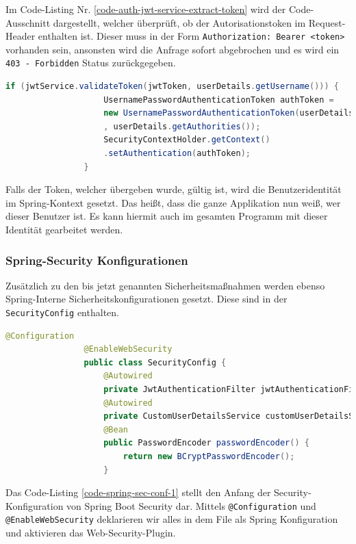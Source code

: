 			
			Im Code-Listing Nr. \ref{code-auth-jwt-service-extract-token} wird der Code-Ausschnitt dargestellt, welcher überprüft, ob der Autorisationstoken im Request-Header enthalten ist. Dieser muss in der Form \texttt{Authorization: Bearer <token>} vorhanden sein, ansonsten wird die Anfrage sofort abgebrochen und es wird ein \texttt{403 - Forbidden} Status zurückgegeben.
			
			\begin{lstlisting}[caption={Validierung des JWT-Tokens und Setzen der Authentifizierung im Spring-Kontext.}, label={code-auth-jwtservice-validate-token}, language=Java]
				if (jwtService.validateToken(jwtToken, userDetails.getUsername())) {
					UsernamePasswordAuthenticationToken authToken =
					new UsernamePasswordAuthenticationToken(userDetails, null
					, userDetails.getAuthorities());
					SecurityContextHolder.getContext()
					.setAuthentication(authToken);
				}
			\end{lstlisting}
			
			Falls der Token, welcher übergeben wurde, gültig ist, wird die Benutzeridentität im Spring-Kontext gesetzt. Das heißt, dass die ganze Applikation nun weiß, wer dieser Benutzer ist. Es kann hiermit auch im gesamten Programm mit dieser Identität gearbeitet werden.

            \newpage
			
			\subsubsection{Spring-Security Konfigurationen}
			
			Zusätzlich zu den bis jetzt genannten Sicherheitsmaßnahmen werden ebenso Spring-Interne Sicherheitskonfigurationen gesetzt. Diese sind in der \texttt{SecurityConfig} enthalten.
			
			\begin{lstlisting}[caption={Initialisierung von allgemeinen Security-Konfigurationen wie dem Passwort-Encoder.}, label={code-spring-sec-conf-1}, language=Java]
				@Configuration
				@EnableWebSecurity
				public class SecurityConfig {
					@Autowired
					private JwtAuthenticationFilter jwtAuthenticationFilter;
					@Autowired
					private CustomUserDetailsService customUserDetailsService;
					@Bean
					public PasswordEncoder passwordEncoder() {
						return new BCryptPasswordEncoder();
					}
				\end{lstlisting}
				
				Das Code-Listing \ref{code-spring-sec-conf-1} stellt den Anfang der Security-Konfiguration von Spring Boot Security dar. Mittels \texttt{@Configuration} und \texttt{@EnableWebSecurity} deklarieren wir alles in dem File als Spring Konfiguration und aktivieren das Web-Security-Plugin.
				
